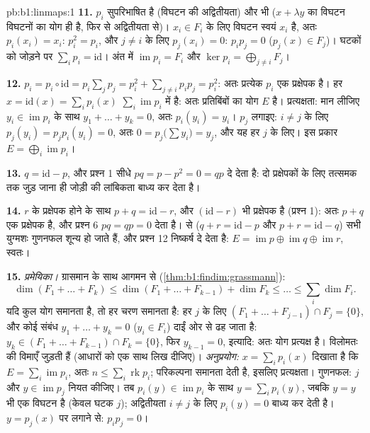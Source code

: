 \begin{solution}{pb:b1:linmaps:1}
\textbf{11.} $p_i$ सुपरिभाषित है (विघटन की अद्वितीयता) और  भी ($x +
\lambda y$ का विघटन विघटनों का योग ही है, फिर से अद्वितीयता से)। $x_i \in
F_i$ के लिए विघटन स्वयं $x_i$ है, अतः $p_i(x_i) = x_i$: $p_i^2 = p_i$, और $j
\neq i$ के लिए $p_j(x_i) = 0$: $p_i p_j = 0$ ($p_j(x) \in F_j$)। घटकों को
जोड़ने पर $\sum_i p_i = \mathrm{id}$। अंत में $\operatorname{im} p_i = F_i$
और $\ker p_i = \bigoplus_{j \neq i} F_j$।

\textbf{12.} $p_i = p_i \circ \mathrm{id} = p_i\sum_j p_j = p_i^2 + \sum_{j
\neq i} p_i p_j = p_i^2$: अतः प्रत्येक $p_i$ एक प्रक्षेपक है। हर $x =
\mathrm{id}(x) = \sum_i p_i(x)$ $\sum_i \operatorname{im} p_i$ में है: अतः
प्रतिबिंबों का योग $E$ है। प्रत्यक्षता: मान लीजिए $y_i \in \operatorname{im}
p_i$ के साथ $y_1 + \dots + y_k = 0$, अतः $p_i(y_i) = y_i$। $p_j$ लगाइए: $i
\neq j$ के लिए $p_j (y_i) = p_j p_i (y_i) = 0$, अतः $0 = p_j\bigl(\sum
y_i\bigr) = y_j$, और यह हर $j$ के लिए। इस प्रकार $E = \bigoplus_i
\operatorname{im} p_i$।

\textbf{13.} $q = \mathrm{id} - p$, और प्रश्न 1 सीधे $pq = p - p^2 = 0 = qp$
दे देता है: दो प्रक्षेपकों के लिए तत्समक तक जुड़ जाना ही जोड़ी की लांबिकता
बाध्य कर देता है।

\textbf{14.} $r$ के प्रक्षेपक होने के साथ $p + q = \mathrm{id} - r$, और
$(\mathrm{id} - r)$ भी प्रक्षेपक है (प्रश्न 1): अतः $p + q$ एक प्रक्षेपक है,
और प्रश्न 6 $pq = qp = 0$ देता है।  से ($q + r = \mathrm{id} - p$ और
$p + r = \mathrm{id} - q$) सभी युग्मशः गुणनफल शून्य हो जाते हैं, और प्रश्न
12 निष्कर्ष दे देता है: $E = \operatorname{im} p \oplus \operatorname{im} q
\oplus \operatorname{im} r$, स्वतः।

\textbf{15.} \emph{प्रमेयिका।} ग्रासमान के साथ आगमन से
(\cref{thm:b1:findim:grassmann}):
\[
\dim(F_1 + \dots + F_k) \leq \dim(F_1 + \dots + F_{k-1}) + \dim
F_k \leq \dots \leq \sum_i \dim F_i .
\]
यदि कुल योग समानता है, तो हर चरण समानता है: हर $j$ के लिए $(F_1 + \dots +
F_{j-1}) \cap F_j = \{0\}$, और कोई संबंध $y_1 + \dots + y_k = 0$ ($y_i \in
F_i$) दाईं ओर से ढह जाता है: $y_k \in (F_1 + \dots + F_{k-1}) \cap F_k =
\{0\}$, फिर $y_{k-1} = 0$, इत्यादि: अतः योग प्रत्यक्ष है। विलोमतः  की विमाएँ जुड़ती हैं (आधारों को एक साथ लिख दीजिए)। \emph{अनुप्रयोग:} $x
= \sum_i p_i(x)$ दिखाता है कि $E = \sum_i \operatorname{im} p_i$, अतः $n
\leq \sum_i \operatorname{rk} p_i$; परिकल्पना समानता देती है, इसलिए
प्रत्यक्षता। गुणनफल: $j$ और $y \in \operatorname{im} p_j$ नियत कीजिए। तब
$p_i(y) \in \operatorname{im} p_i$ के साथ $y = \sum_i p_i(y)$, जबकि $y = y$
भी एक विघटन है (केवल घटक $j$); अद्वितीयता $i \neq j$ के लिए $p_i(y) = 0$
बाध्य कर देती है। $y = p_j(x)$ पर लगाने से: $p_i p_j = 0$।


\end{solution}
